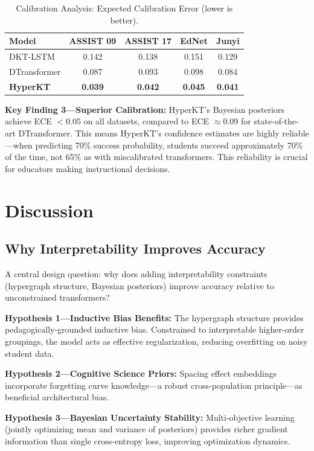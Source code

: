 \documentclass[10pt,twocolumn]{article}
\begin{document}
\begin{table}[h]
\centering
\small
\caption{Calibration Analysis: Expected Calibration Error (lower is better).}
\begin{tabular}{lcccc}
\toprule
\textbf{Model} & \textbf{ASSIST 09} & \textbf{ASSIST 17} & \textbf{EdNet} & \textbf{Junyi} \\
\midrule
DKT-LSTM & 0.142 & 0.138 & 0.151 & 0.129 \\
DTransformer & 0.087 & 0.093 & 0.098 & 0.084 \\
\textbf{HyperKT} & \textbf{0.039} & \textbf{0.042} & \textbf{0.045} & \textbf{0.041} \\
\bottomrule
\end{tabular}
\label{tab:calibration}
\end{table}

\textbf{Key Finding 3—Superior Calibration:} HyperKT's Bayesian posteriors achieve ECE $< 0.05$ on all datasets, compared to ECE $\approx 0.09$ for state-of-the-art DTransformer. This means HyperKT's confidence estimates are highly reliable—when predicting 70\% success probability, students succeed approximately 70\% of the time, not 65\% as with miscalibrated transformers. This reliability is crucial for educators making instructional decisions.

\section{Discussion}

\subsection{Why Interpretability Improves Accuracy}

A central design question: why does adding interpretability constraints (hypergraph structure, Bayesian posteriors) improve accuracy relative to unconstrained transformers?

\textbf{Hypothesis 1—Inductive Bias Benefits:} The hypergraph structure provides pedagogically-grounded inductive bias. Constrained to interpretable higher-order groupings, the model acts as effective regularization, reducing overfitting on noisy student data.

\textbf{Hypothesis 2—Cognitive Science Priors:} Spacing effect embeddings incorporate forgetting curve knowledge—a robust cross-population principle—as beneficial architectural bias.

\textbf{Hypothesis 3—Bayesian Uncertainty Stability:} Multi-objective learning (jointly optimizing mean and variance of posteriors) provides richer gradient information than single cross-entropy loss, improving optimization dynamics.
\end{document}
